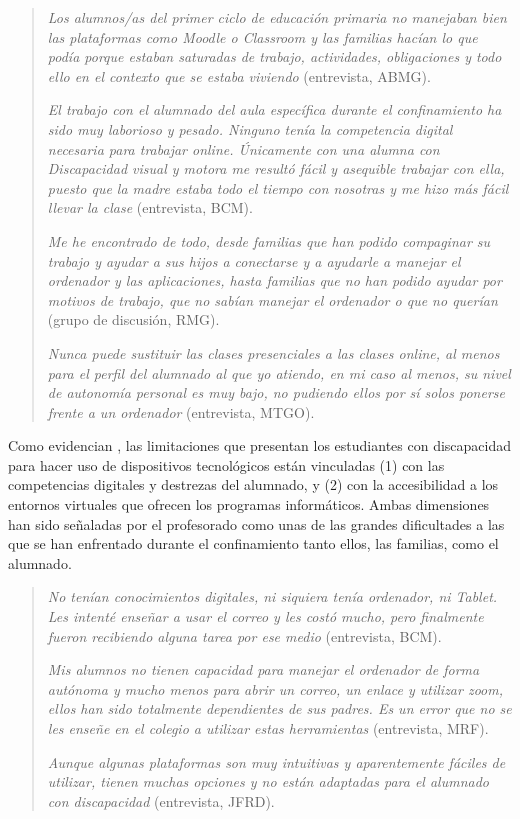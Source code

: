 \documentclass{textolivre}
\begin{document}
\begin{quote}
\emph{Los alumnos/as del primer ciclo de educación primaria no manejaban bien las plataformas como Moodle o Classroom y las familias hacían lo que podía porque estaban saturadas de trabajo, actividades, obligaciones y todo ello en el contexto que se estaba viviendo} (entrevista, ABMG).

\emph{El trabajo con el alumnado del aula específica durante el confinamiento ha sido muy laborioso y pesado. Ninguno tenía la competencia digital necesaria para trabajar online. Únicamente con una alumna con Discapacidad visual y motora me resultó fácil y asequible trabajar con ella, puesto que la madre estaba todo el tiempo con nosotras y me hizo más fácil llevar la clase} (entrevista, BCM).

\emph{Me he encontrado de todo, desde familias que han podido compaginar su trabajo y ayudar a sus hijos a conectarse y a ayudarle a manejar el ordenador y las aplicaciones, hasta familias que no han podido ayudar por motivos de trabajo, que no sabían manejar el ordenador o que no querían} (grupo de discusión, RMG).

\emph{Nunca puede sustituir las clases presenciales a las clases online, al menos para el perfil del alumnado al que yo atiendo, en mi caso al menos, su nivel de autonomía personal es muy bajo, no pudiendo ellos por sí solos ponerse frente a un ordenador} (entrevista, MTGO).
\end{quote}

Como evidencian \textcite{vega2020}, %
las limitaciones que presentan los estudiantes con discapacidad para hacer uso de dispositivos tecnológicos están vinculadas (1) con las competencias digitales y destrezas del alumnado, y (2) con la accesibilidad a los entornos virtuales que ofrecen los programas informáticos. Ambas dimensiones han sido señaladas por el profesorado como unas de las grandes dificultades a las que se han enfrentado durante el confinamiento tanto ellos, las familias, como el alumnado.

\begin{quote}
\emph{No tenían conocimientos digitales, ni siquiera tenía ordenador, ni Tablet. Les intenté enseñar a usar el correo y les costó mucho, pero finalmente fueron recibiendo alguna tarea por ese medio} (entrevista, BCM).

\emph{Mis alumnos no tienen capacidad para manejar el ordenador de forma autónoma y mucho menos para abrir un correo, un enlace y utilizar zoom, ellos han sido totalmente dependientes de sus padres. Es un error que no se les enseñe en el colegio a utilizar estas herramientas} (entrevista, MRF).

\emph{Aunque algunas plataformas son muy intuitivas y aparentemente fáciles de utilizar, tienen muchas opciones y no están adaptadas para el alumnado con discapacidad} (entrevista, JFRD).
\end{quote}
\end{document}
